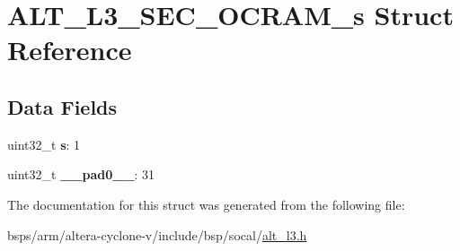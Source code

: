 \hypertarget{structALT__L3__SEC__OCRAM__s}{}\section{A\+L\+T\+\_\+\+L3\+\_\+\+S\+E\+C\+\_\+\+O\+C\+R\+A\+M\+\_\+s Struct Reference}
\label{structALT__L3__SEC__OCRAM__s}
\subsection*{Data Fields}
\begin{DoxyCompactItemize}
\item 
\mbox{\label{structALT__L3__SEC__OCRAM__s_ad5d270ed048ae6b33a35a098a0e9dcb0}} 
uint32\+\_\+t {\bfseries s}\+: 1
\item 
\mbox{\label{structALT__L3__SEC__OCRAM__s_ac494318939e8fd1e5bdeb872f8027b03}} 
uint32\+\_\+t {\bfseries \+\_\+\+\_\+pad0\+\_\+\+\_\+}\+: 31
\end{DoxyCompactItemize}


The documentation for this struct was generated from the following file\+:\begin{DoxyCompactItemize}
\item 
bsps/arm/altera-\/cyclone-\/v/include/bsp/socal/\mbox{\hyperlink{alt__l3_8h}{alt\+\_\+l3.\+h}}\end{DoxyCompactItemize}
